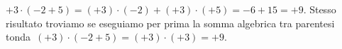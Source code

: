 \begin{exrig}
 \begin{esempio}
 $+3\cdot(-2+5)=(+3)\cdot(-2)+(+3)\cdot(+5)=-6+15=+9$.
Stesso risultato troviamo se eseguiamo per prima la somma algebrica tra parentesi
tonda~$(+3)\cdot(-2+5)=(+3)\cdot(+3)=+9$.
 \end{esempio}

\end{exrig}

\ovalbox{\risolvii \ref{ese:2.28}, \ref{ese:2.29}, \ref{ese:2.30}}

\newpage

\cleardoublepage
